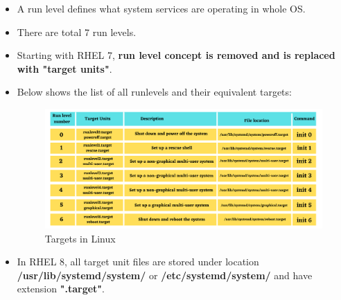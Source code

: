\setlength{\columnsep}{3pt}
\begin{flushleft}
	\bigskip
	\begin{itemize}
		\item A run level defines what system services are operating in whole OS.
		\item There are total 7 run levels.
		\item Starting with RHEL 7, \textbf{run level concept is removed and is replaced with "target units"}.
		\item Below shows the list of all runlevels and their equivalent targets:
	\begin{figure}[h!]
		\centering
		\includegraphics[scale=0.35]{content/chapter17/images/run.png}
		\caption{Targets in Linux}
		\label{fig:stage}
	\end{figure}

	\item In RHEL 8, all target unit files are stored under location \textbf{/usr/lib/systemd/system/} or \textbf{/etc/systemd/system/} and have extension \textbf{".target"}.
		

	\end{itemize}
	
	
\end{flushleft}
\newpage